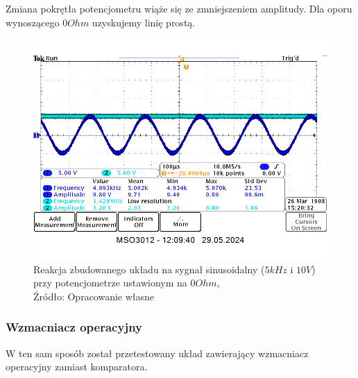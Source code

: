 \documentclass{article}
\begin{document}
        Zmiana pokrętła potencjometru wiąże się ze zmniejszeniem amplitudy. Dla oporu wynoszącego $0Ohm$ uzyskujemy linię prostą.

        \begin{figure}[!ht]
          \centering
          \includegraphics[scale=0.3]{grafiki/komparator_5kHz_10V_sin_0ohm.png}
          \caption{Reakcja zbudowanego układu na sygnał sinusoidalny ($5kHz$ i $10V$) przy potencjometrze ustawionym na $0Ohm$,
          \\Źródło: Opracowanie własne}
        \end{figure}


      \subsubsection{Wzmacniacz operacyjny}
        W ten sam sposób został przetestowany układ zawierający wzmacniacz operacyjny zamiast komparatora.
\end{document}
